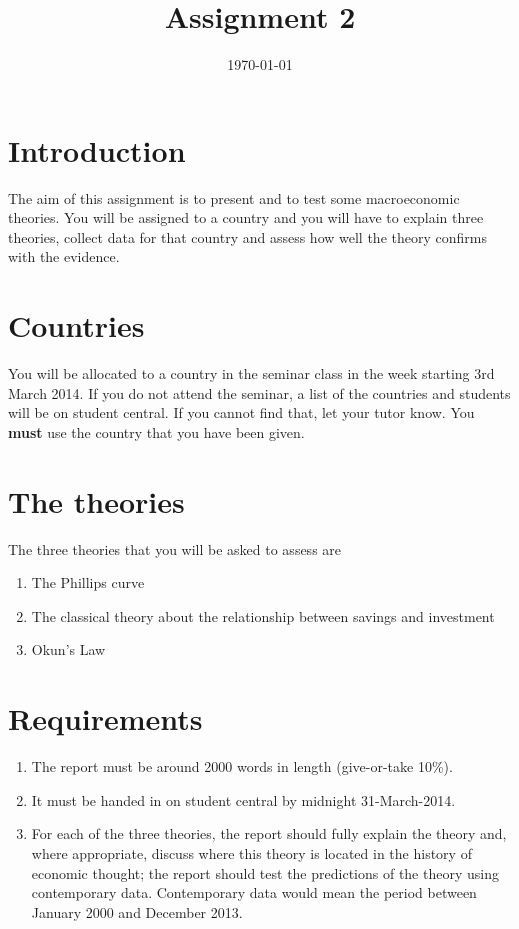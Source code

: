 \documentclass[12pt, a4paper, oneside]{article}\usepackage{graphicx, color}
\begin{document}
\title{Assignment 2}
\date{\today}
\maketitle
\section*{Introduction}
The aim of this assignment is to present and to test some macroeconomic theories.  You will be assigned to a country and you will have to explain three theories, collect data for that country and assess how well the theory confirms with the evidence.  

\section*{Countries}
You will be allocated to a country in the seminar class in the week starting 3rd March 2014.  If you do not attend the seminar, a list of the countries and students will be on student central.  If you cannot find that, let your tutor know. You \textbf{must} use the country that you have been given. 

\section*{The theories}
The three theories that you will be asked to assess are 
\begin{enumerate}
\item The Phillips curve
\item The classical theory about the relationship between savings and investment
\item Okun's Law
\end{enumerate}

\section*{Requirements}
\begin{enumerate}
\item The report must be around 2000 words in length (give-or-take 10\%).  
\item It must be handed in on student central by midnight 31-March-2014.  
\item For each of the three theories, the report should fully explain the theory and, where appropriate, discuss where this theory is located in the history of economic thought; the report should test the predictions of the theory using contemporary data.  Contemporary data would mean the period between January 2000 and December 2013. 
\end{enumerate}
\end{document}
